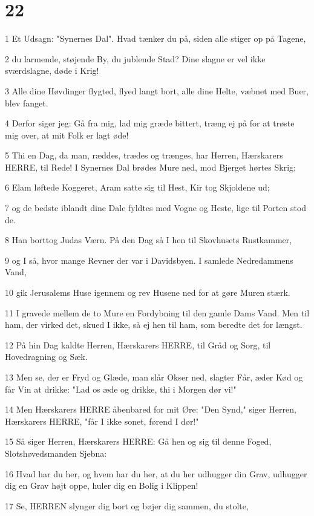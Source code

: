 \chapter{22}

\par 1 Et Udsagn: "Synernes Dal". Hvad tænker du på, siden alle stiger op på Tagene,
\par 2 du larmende, støjende By, du jublende Stad? Dine slagne er vel ikke sværdslagne, døde i Krig!
\par 3 Alle dine Høvdinger flygted, flyed langt bort, alle dine Helte, væbnet med Buer, blev fanget.
\par 4 Derfor siger jeg: Gå fra mig, lad mig græde bittert, træng ej på for at trøste mig over, at mit Folk er lagt øde!
\par 5 Thi en Dag, da man, ræddes, trædes og trænges, har Herren, Hærskarers HERRE, til Rede! I Synernes Dal brødes Mure ned, mod Bjerget hørtes Skrig;
\par 6 Elam løftede Koggeret, Aram satte sig til Hest, Kir tog Skjoldene ud;
\par 7 og de bedste iblandt dine Dale fyldtes med Vogne og Heste, lige til Porten stod de.
\par 8 Han borttog Judas Værn. På den Dag så I hen til Skovhusets Rustkammer,
\par 9 og I så, hvor mange Revner der var i Davidsbyen. I samlede Nedredammens Vand,
\par 10 gik Jerusalems Huse igennem og rev Husene ned for at gøre Muren stærk.
\par 11 I gravede mellem de to Mure en Fordybning til den gamle Dams Vand. Men til ham, der virked det, skued I ikke, så ej hen til ham, som beredte det for længst.
\par 12 På hin Dag kaldte Herren, Hærskarers HERRE, til Gråd og Sorg, til Hovedragning og Sæk.
\par 13 Men se, der er Fryd og Glæde, man slår Okser ned, slagter Får, æder Kød og får Vin at drikke: "Lad os æde og drikke, thi i Morgen dør vi!"
\par 14 Men Hærskarers HERRE åbenbared for mit Øre: "Den Synd," siger Herren, Hærskarers HERRE, "får I ikke sonet, førend I dør!"
\par 15 Så siger Herren, Hærskarers HERRE: Gå hen og sig til denne Foged, Slotshøvedsmanden Sjebna:
\par 16 Hvad har du her, og hvem har du her, at du her udhugger din Grav, udhugger dig en Grav højt oppe, huler dig en Bolig i Klippen!
\par 17 Se, HERREN slynger dig bort og bøjer dig sammen, du stolte,
